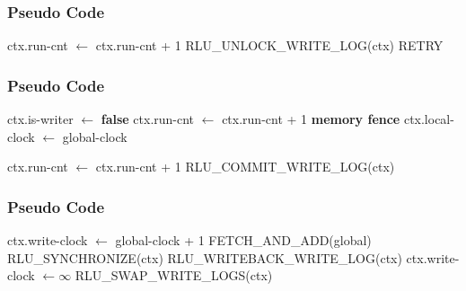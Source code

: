 \documentclass{beamer}
\begin{document}

\begin{frame}[t]
  \frametitle{Pseudo Code}
  \footnotesize{
  \begin{algorithmic}
    \State ctx.run-cnt $\leftarrow$ ctx.run-cnt + 1 
    \State RLU\_UNLOCK\_WRITE\_LOG(ctx) 
    \State RETRY
    \EndIf
    \EndFunction
  \end{algorithmic}
  }

\end{frame}


\begin{frame}[t]
  \frametitle{Pseudo Code}

  \footnotesize{
    \begin{algorithmic}
      \State ctx.is-writer $\leftarrow$ \textbf{false}
      \State ctx.run-cnt $\leftarrow$ ctx.run-cnt + 1 
      \State \textbf{memory fence}
      \State ctx.local-clock $\leftarrow$ global-clock 
      \EndFunction
    \end{algorithmic}

    \begin{algorithmic}
      \State ctx.run-cnt $\leftarrow$ ctx.run-cnt + 1 
      \State RLU\_COMMIT\_WRITE\_LOG(ctx) 
      \EndIf
      \EndFunction
    \end{algorithmic}
  }

\end{frame}


\begin{frame}[t]
  \frametitle{Pseudo Code}
  
    \footnotesize{
    \begin{algorithmic}
      \State ctx.write-clock $\leftarrow$ global-clock + 1 
      \State FETCH\_AND\_ADD(global)
      \State RLU\_SYNCHRONIZE(ctx)
      \State RLU\_WRITEBACK\_WRITE\_LOG(ctx)
      \State ctx.write-clock $\leftarrow \infty$ 
      \State RLU\_SWAP\_WRITE\_LOGS(ctx) 
      \EndFunction
    \end{algorithmic}
  }

\end{frame}
\end{document}
